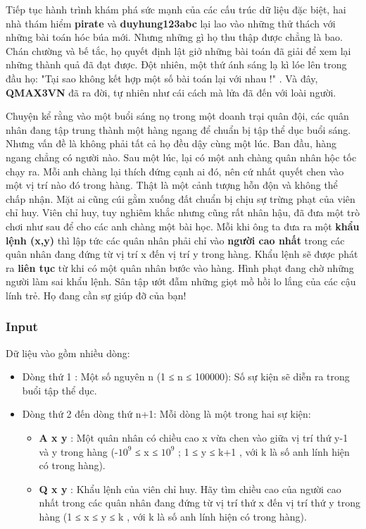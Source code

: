 







   Tiếp tục hành trình khám phá sức mạnh của các cấu trúc dữ liệu đặc biệt, hai nhà thám hiểm   \textbf{pirate}   và   \textbf{duyhung123abc}   lại lao vào những thử thách với những bài toán hóc búa mới. Nhưng những gì họ thu thập được chẳng là bao. Chán chường và bế tắc, họ quyết định lật giở những bài toán đã giải để xem lại những thành quả đã đạt được. Đột nhiên, một thứ ánh sáng lạ kì lóe lên trong đầu họ:   "Tại sao không kết hợp một số bài toán lại với nhau !"   . Và đây,   \textbf{    QMAX3VN   }   đã ra đời, tự nhiên như cái cách mà lửa đã đến với loài người.  

   Chuyện kể rằng vào một buổi sáng nọ trong một doanh trại quân đội, các quân nhân đang tập trung thành một hàng ngang để chuẩn bị tập thể dục buổi sáng. Nhưng vấn đề là không phải tất cả họ đều dậy cùng một lúc. Ban đầu, hàng ngang chẳng có người nào. Sau một lúc, lại có một anh chàng quân nhân hộc tốc chạy ra. Mỗi anh chàng lại thích đứng cạnh ai đó, nên cứ nhất quyết chen vào một vị trí nào đó trong hàng. Thật là một cảnh tượng hỗn độn và không thể chấp nhận. Mặt ai cũng cúi gằm xuống đất chuẩn bị chịu sự trừng phạt của viên chỉ huy. Viên chỉ huy, tuy nghiêm khắc nhưng cũng rất nhân hậu, đã đưa một trò chơi như sau để cho các anh chàng một bài học. Mỗi khi ông ta đưa ra một   \textbf{    khẩu lệnh (x,y)   }   thì lập tức các quân nhân phải chỉ vào   \textbf{    người cao nhất   }   trong các quân nhân đang đứng từ vị trí x đến vị trí y trong hàng. Khẩu lệnh sẽ được phát ra   \textbf{    liên tục   }   từ khi có một quân nhân bước vào hàng. Hình phạt đang chờ những người làm sai khẩu lệnh. Sân tập ướt đẫm những giọt mồ hồi lo lắng của các cậu lính trẻ. Họ đang cần sự giúp đỡ của bạn!  

\subsubsection{   Input  }

   Dữ liệu vào gồm nhiều dòng:  
\begin{itemize}
	\item     Dòng thứ 1 : Một số nguyên n (1 ≤ n ≤ 100000): Số sự kiện sẽ diễn ra trong buổi tập thể dục.   
	\item     Dòng thứ 2 đến dòng thứ n+1: Mỗi dòng là một trong hai sự kiện:    
\begin{itemize}
	\item \textbf{       A x y      }      : Một quân nhân có chiều cao x vừa chen vào giữa vị trí thứ y-1 và y trong hàng (-$10^{9}$      ≤ x ≤ $10^{9}$      ; 1 ≤ y ≤ k+1 , với k là số anh lính hiện có trong hàng).     
	\item \textbf{       Q x y      }      : Khẩu lệnh của viên chỉ huy. Hãy tìm chiều cao của người cao nhất trong các quân nhân đang đứng từ vị trí thứ x đến vị trí thứ y trong hàng (1 ≤ x ≤ y ≤ k , với k là số anh lính hiện có trong hàng).     
\end{itemize}
\end{itemize}



